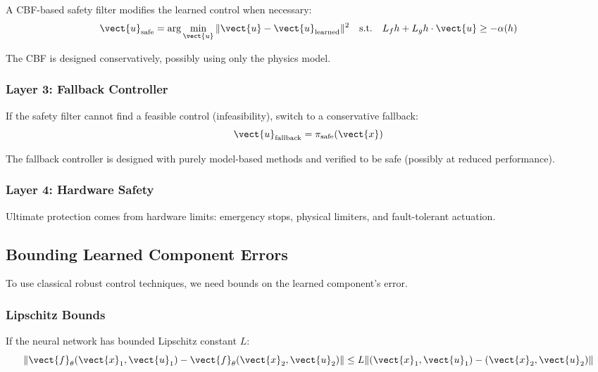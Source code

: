 A CBF-based safety filter modifies the learned control when necessary:
\begin{equation}
\vect{u}_{\text{safe}} = \arg\min_{\vect{u}} \|\vect{u} - \vect{u}_{\text{learned}}\|^2 \quad \text{s.t.} \quad L_f h + L_g h \cdot \vect{u} \geq -\alpha(h)
\label{eq:safety_filter_layer}
\end{equation}

The CBF is designed conservatively, possibly using only the physics model.

\subsubsection{Layer 3: Fallback Controller}

If the safety filter cannot find a feasible control (infeasibility), switch to a conservative fallback:
\begin{equation}
\vect{u}_{\text{fallback}} = \pi_{\text{safe}}(\vect{x})
\end{equation}

The fallback controller is designed with purely model-based methods and verified to be safe (possibly at reduced performance).

\subsubsection{Layer 4: Hardware Safety}

Ultimate protection comes from hardware limits: emergency stops, physical limiters, and fault-tolerant actuation.


\subsection{Bounding Learned Component Errors}

To use classical robust control techniques, we need bounds on the learned component's error.

\subsubsection{Lipschitz Bounds}

If the neural network has bounded Lipschitz constant $L$:
\begin{equation}
\|\vect{f}_\theta(\vect{x}_1, \vect{u}_1) - \vect{f}_\theta(\vect{x}_2, \vect{u}_2)\| \leq L \|(\vect{x}_1, \vect{u}_1) - (\vect{x}_2, \vect{u}_2)\|
\label{eq:lipschitz_bound}
\end{equation}

